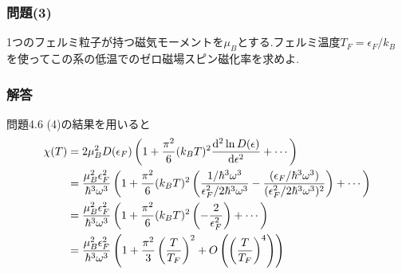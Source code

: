 \subsubsection*{問題(3)}
1つのフェルミ粒子が持つ磁気モーメントを$\mu_B$とする.フェルミ温度$T_F=\epsilon_F/k_B$
を使ってこの系の低温でのゼロ磁場スピン磁化率を求めよ.\\
\hrulefill
\subsubsection*{解答}
問題4.6 (4)の結果を用いると
\begin{align}
  \begin{split}
    \chi(T)&=2\mu_B^2D(\epsilon_F)\left(1+\frac{\pi^2}{6}(k_BT)^2\frac{{\rm d}^2\ln D(\epsilon)}{{\rm d}\epsilon^2}+\cdots\right)\\
    &=\frac{\mu_B^2\epsilon_F^2}{\hbar^3\omega^3}\left(1+\frac{\pi^2}{6}(k_BT)^2\left(\frac{1/\hbar^3\omega^3}{\epsilon_F^2/2\hbar^3\omega^3}-\frac{(\epsilon_F/\hbar^3\omega^3)}{(\epsilon_F^2/2\hbar^3\omega^3)^2}\right)+\cdots\right)\\
    &=\frac{\mu_B^2\epsilon_F^2}{\hbar^3\omega^3}\left(1+\frac{\pi^2}{6}(k_BT)^2\left(-\frac{2}{\epsilon_F^2}\right)+\cdots\right)\\
    &=\frac{\mu_B^2\epsilon_F^2}{\hbar^3\omega^3}\left(1+\frac{\pi^2}{3}\left(\frac{T}{T_F}\right)^2+O\left(\left(\frac{T}{T_F}\right)^4\right)\right)
  \end{split}
\end{align}